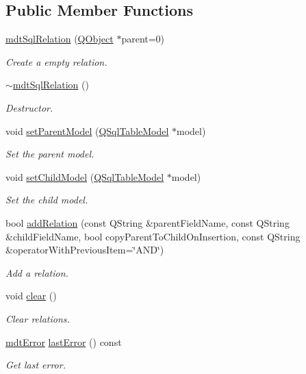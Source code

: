 \subsection*{Public Member Functions}
\begin{DoxyCompactItemize}
\item 
\hyperlink{classmdt_sql_relation_a65d9602a4663c8c356938ba9a217704f}{mdt\-Sql\-Relation} (\hyperlink{class_q_object}{Q\-Object} $\ast$parent=0)
\begin{DoxyCompactList}\small\item\em Create a empty relation. \end{DoxyCompactList}\item 
\hyperlink{classmdt_sql_relation_a22c7de1daa71abbde33199a08541310b}{$\sim$mdt\-Sql\-Relation} ()
\begin{DoxyCompactList}\small\item\em Destructor. \end{DoxyCompactList}\item 
void \hyperlink{classmdt_sql_relation_a5ac3a82c5d3e33b5e40b86acfe7e2a03}{set\-Parent\-Model} (\hyperlink{class_q_sql_table_model}{Q\-Sql\-Table\-Model} $\ast$model)
\begin{DoxyCompactList}\small\item\em Set the parent model. \end{DoxyCompactList}\item 
void \hyperlink{classmdt_sql_relation_ad74021dcf86c528044bf67220ed36833}{set\-Child\-Model} (\hyperlink{class_q_sql_table_model}{Q\-Sql\-Table\-Model} $\ast$model)
\begin{DoxyCompactList}\small\item\em Set the child model. \end{DoxyCompactList}\item 
bool \hyperlink{classmdt_sql_relation_a5980d1df4582971666ffe1c1d7639799}{add\-Relation} (const Q\-String \&parent\-Field\-Name, const Q\-String \&child\-Field\-Name, bool copy\-Parent\-To\-Child\-On\-Insertion, const Q\-String \&operator\-With\-Previous\-Item=\char`\"{}A\-N\-D\char`\"{})
\begin{DoxyCompactList}\small\item\em Add a relation. \end{DoxyCompactList}\item 
void \hyperlink{classmdt_sql_relation_a01469fb1baf7327ca6ddbcd1595e0d7c}{clear} ()
\begin{DoxyCompactList}\small\item\em Clear relations. \end{DoxyCompactList}\item 
\hyperlink{classmdt_error}{mdt\-Error} \hyperlink{classmdt_sql_relation_a51cf2e1741445d465456d71293a738cc}{last\-Error} () const 
\begin{DoxyCompactList}\small\item\em Get last error. \end{DoxyCompactList}\end{DoxyCompactItemize}


